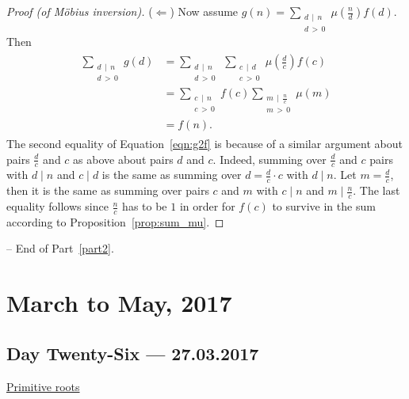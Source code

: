 \documentclass{amsbook}
\theoremstyle{plain}
\theoremstyle{definition}
\theoremstyle{remark}
\numberwithin{equation}{chapter}
\numberwithin{figure}{chapter}
\begin{document}
\begin{proof}[Proof {\rm (of M\"obius inversion)}]
    ($\Leftarrow$) Now assume $g(n) = \sum_{\substack{d \, \mid \, n \\ d \, > \, 0}} \mu \left(\frac{n}d\right) f(d)$. Then
    \begin{align}\label{eqn:g2f}
      \begin{split}
      \sum_{\substack{d \, \mid \, n \\ d \, > \, 0}}  g (d) &=
                                                             \sum_{\substack{d \, \mid \, n \\ d \, > \, 0}} \, \sum_{\substack{c \, \mid \, d \\ c \, > \, 0}} \mu \left( \frac{d}c \right) f(c) \\
                                                           &= \sum_{\substack{c \, \mid \, n \\ c \, > \, 0}} f(c)
      \sum_{\substack{m \, \mid \, \frac{n}c \\ m \, > \, 0}} \mu (m) \\
      &= f(n).
      \end{split}
    \end{align}
    The second equality of Equation~\eqref{eqn:g2f} is because of a similar argument about pairs $\frac{d}c$ and $c$ as above about pairs $d$ and $c$. Indeed, summing over $\frac{d}c$ and $c$ pairs with $d \mid n$ and $c \mid d$ is the same as summing over $d = \frac{d}c \cdot c$ with $d \mid n$. Let $m = \frac{d}c$, then it is the same as summing over pairs $c$ and $m$ with $c \mid n$ and $m \mid \frac{n}c$. The last equality follows since $\frac{n}c$ has to be $1$ in order for $f(c)$ to survive in the sum according to Proposition~\ref{prop:sum_mu}.
\end{proof}

-- End of Part~\ref{part2}.

\part{March to May, 2017}\label{part3}

\chapter[Lecture Twenty-Six]{Day Twenty-Six \hfill {\footnotesize \rm --- 27.03.2017}}

\underline{Primitive roots}\\
\end{document}

